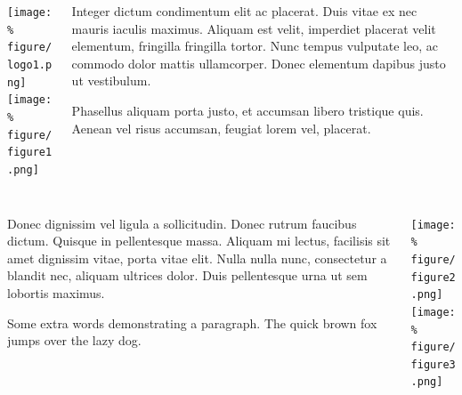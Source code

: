 \documentclass[unknownkeysallowed,usepdftitle=false, parskip=full]{beamer}
\newcommand{\secvariable}{nothing}
\newcommand{\mysection}[1]{\renewcommand{\secvariable}{#1}
}
\begin{document}
\begin{frame}\label{\secvariable}
  \begin{columns}[t]
  \begin{column}[c]{0.45\textwidth}
\texttt{[image: \%
figure/logo1.png]}\\
\vspace{12pt}
\texttt{[image: \%
figure/figure1.png]}
    \end{column}
    \begin{column}[c]{0.45\textwidth}
    \parbox{\linewidth}{

      Integer dictum condimentum elit ac placerat. Duis vitae ex nec mauris iaculis maximus. Aliquam est velit, imperdiet placerat velit elementum, fringilla fringilla tortor. Nunc tempus vulputate leo, ac commodo dolor mattis ullamcorper. Donec elementum dapibus justo ut vestibulum. 
      
      \vspace{12pt}
      
      Phasellus aliquam porta justo, et accumsan libero tristique quis. Aenean vel risus accumsan, feugiat lorem vel, placerat.
      }
    \end{column}
    
  \end{columns}

  
\end{frame}

\mysection{radar}
\begin{frame}\label{\secvariable}
  \begin{columns}[t]
    \begin{column}[c]{0.45\textwidth}
    \parbox{\linewidth}{

      Donec dignissim vel ligula a sollicitudin. Donec rutrum faucibus dictum. Quisque in pellentesque massa. Aliquam mi lectus, facilisis sit amet dignissim vitae, porta vitae elit. Nulla nulla nunc, consectetur a blandit nec, aliquam ultrices dolor. Duis pellentesque urna ut sem lobortis maximus.
      
      \vspace{12pt}
      
	  Some extra words demonstrating a paragraph. The quick brown fox jumps over the lazy dog.
      }
    \end{column}
    \begin{column}[c]{0.45\textwidth}
\texttt{[image: \%
figure/figure2.png]}\\
\vspace{12pt}
\texttt{[image: \%
figure/figure3.png]}
    \end{column}
  \end{columns}

  
\end{frame}
\end{document}
